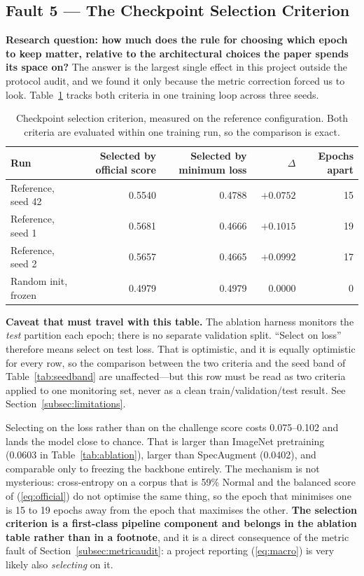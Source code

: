 \documentclass[journal,onecolumn]{IEEEtran}
\begin{document}
\subsection{Fault 5 --- The Checkpoint Selection Criterion}
\label{subsec:selection}

\textbf{Research question: how much does the rule for choosing which epoch to keep
matter, relative to the architectural choices the paper spends its space on?}
The answer is the largest single effect in this project outside the protocol
audit, and we found it only because the metric correction forced us to look.
Table~\ref{tab:selection} tracks both criteria in one training loop across three
seeds.

\begin{table}[!t]
\centering
\caption{Checkpoint selection criterion, measured on the reference configuration.
Both criteria are evaluated within one training run, so the comparison is exact.}
\label{tab:selection}
\small
\begin{tabular}{lrrrr}
\toprule
Run & Selected by official score & Selected by minimum loss & $\Delta$ & Epochs apart \\
\midrule
Reference, seed 42 & 0.5540 & 0.4788 & $\mathbf{+0.0752}$ & 15 \\
Reference, seed 1  & 0.5681 & 0.4666 & $\mathbf{+0.1015}$ & 19 \\
Reference, seed 2  & 0.5657 & 0.4665 & $\mathbf{+0.0992}$ & 17 \\
Random init, frozen & 0.4979 & 0.4979 & $\phantom{+}0.0000$ & \phantom{0}0 \\
\bottomrule
\end{tabular}

\vspace{2pt}
\footnotesize \textbf{Caveat that must travel with this table.} The ablation
harness monitors the \emph{test} partition each epoch; there is no separate
validation split. ``Select on loss'' therefore means select on test loss. That is
optimistic, and it is equally optimistic for every row, so the comparison between
the two criteria and the seed band of Table~\ref{tab:seedband} are unaffected---but
this row must be read as two criteria applied to one monitoring set, never as a
clean train/validation/test result. See Section~\ref{subsec:limitations}.
\end{table}

Selecting on the loss rather than on the challenge score costs 0.075--0.102 and
lands the model close to chance. That is larger than ImageNet pretraining (0.0603
in Table~\ref{tab:ablation}), larger than SpecAugment (0.0402), and comparable
only to freezing the backbone entirely. The mechanism is not mysterious:
cross-entropy on a corpus that is 59\% Normal and the balanced score of
(\ref{eq:official}) do not optimise the same thing, so the epoch that minimises one
is 15 to 19 epochs away from the epoch that maximises the other. \textbf{The
selection criterion is a first-class pipeline component and belongs in the
ablation table rather than in a footnote}, and it is a direct consequence of the
metric fault of Section~\ref{subsec:metricaudit}: a project reporting
(\ref{eq:macro}) is very likely also \emph{selecting} on it.
\end{document}
